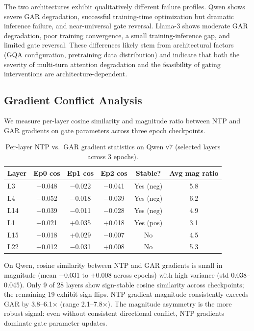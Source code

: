\documentclass[11pt,a4paper]{article}
\begin{document}
The two architectures exhibit qualitatively different failure profiles. Qwen shows severe GAR degradation, successful training-time optimization but dramatic inference failure, and near-universal gate reversal. Llama-3 shows moderate GAR degradation, poor training convergence, a small training-inference gap, and limited gate reversal. These differences likely stem from architectural factors (GQA configuration, pretraining data distribution) and indicate that both the severity of multi-turn attention degradation and the feasibility of gating interventions are architecture-dependent.

\subsection{Gradient Conflict Analysis}

We measure per-layer cosine similarity and magnitude ratio between NTP and GAR gradients on gate parameters across three epoch checkpoints.

\begin{table}[h]
\centering
\caption{Per-layer NTP vs.\ GAR gradient statistics on Qwen v7 (selected layers across 3 epochs).}
\label{tab:grad_qwen}
\begin{tabular}{lccccc}
\toprule
Layer & Ep0 cos & Ep1 cos & Ep2 cos & Stable? & Avg mag ratio \\
\midrule
L3  & $-$0.048 & $-$0.022 & $-$0.041 & Yes (neg) & 5.8 \\
L4  & $-$0.052 & $-$0.018 & $-$0.039 & Yes (neg) & 6.2 \\
L14 & $-$0.039 & $-$0.011 & $-$0.028 & Yes (neg) & 4.9 \\
L1  & +0.021 & +0.035 & +0.018 & Yes (pos) & 3.1 \\
L15 & $-$0.018 & +0.029 & $-$0.007 & No & 4.5 \\
L22 & +0.012 & $-$0.031 & +0.008 & No & 5.3 \\
\bottomrule
\end{tabular}
\end{table}

On Qwen, cosine similarity between NTP and GAR gradients is small in magnitude (mean $-$0.031 to $+$0.008 across epochs) with high variance (std 0.038--0.045). Only 9 of 28 layers show sign-stable cosine similarity across checkpoints; the remaining 19 exhibit sign flips. NTP gradient magnitude consistently exceeds GAR by 3.8--6.1$\times$ (range 2.1--7.8$\times$). The magnitude asymmetry is the more robust signal: even without consistent directional conflict, NTP gradients dominate gate parameter updates.
\end{document}
